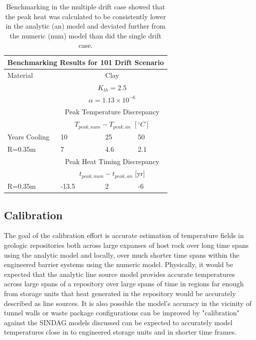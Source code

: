\documentclass{article}
\begin{document}
\begin{table}
  \centering
  \footnotesize{
  \begin{tabular}{|l|l|l|l|}
    \multicolumn{4}{c}{\textbf{Benchmarking Results for 101 Drift Scenario}}\\
    \hline
    Material & \multicolumn{3}{|c|}{Clay} \\
    & \multicolumn{3}{|c|}{$K_{th}=2.5$}\\ 
    & \multicolumn{3}{|c|}{$\alpha=1.13\times10^{-6}$}  \\
    \hline
    & \multicolumn{3}{|c|}{Peak Temperature Discrepancy} \\
    & \multicolumn{3}{|c|}{$T_{peak,num}-T_{peak,an}$ $[^{\circ}C]$} \\
    \hline
    Years Cooling  & 10  & 25 & 50 \\
    \hline
    R=0.35m   & 7 & 4.6 & 2.1 \\
    \hline
    &\multicolumn{3}{|c|}{Peak Heat Timing Discrepancy}\\
    &\multicolumn{3}{|c|}{ $t_{peak,num}-t_{peak,an}$ [yr]} \\
    \hline
    R=0.35m       & -13.5   & 2   & -6  \\
    \hline
  \end{tabular}
  \caption{Benchmarking in the multiple drift case showed that the peak heat was 
  calculated to be consistently lower in the analytic (an) model and deviated further
  from the numeric (num)  model than did the single drift case.
  }
  \label{tab:benchMulti}
  }
\end{table}


\subsection{Calibration}

The goal of the calibration effort is accurate estimation of temperature fields in 
geologic repositories both across large expanses of host rock over long time 
spans using the analytic model and locally, over much shorter time spans within the 
engineered barrier systems using the numeric model.  Physically, it would be expected 
that the analytic line source model provides accurate temperatures across large spans
of a repository over large spans of time in regions far enough from storage units that 
heat generated in the repository would be accurately described as line sources. It is also
possible the model's accuracy in the vicinity of tunnel walls or waste package 
configurations can be improved by "calibration" against the SINDAG models discussed can  
be expected to accurately model temperatures close in to engineered storage units 
and in shorter time frames.
\end{document}
